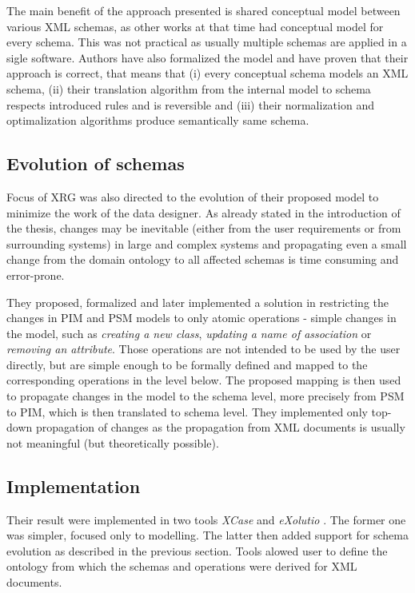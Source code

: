 The main benefit of the approach presented is shared conceptual model between various XML schemas, as other works at that time had conceptual model for every schema. This was not practical as usually multiple schemas are applied in a sigle software. Authors have also formalized the model and have proven that their approach is correct, that means that (i) every conceptual schema models an XML schema, (ii) their translation algorithm from the internal model to schema respects introduced rules and is reversible and (iii) their normalization and optimalization algorithms produce semantically same schema.

\subsection{Evolution of schemas}

Focus of XRG was also directed to the evolution \cite{nevcasky2012evolution} of their proposed model to minimize the work of the data designer. As already stated in the introduction of the thesis, changes may be inevitable (either from the user requirements or from surrounding systems) in large and complex systems and propagating even a small change from the domain ontology to all affected schemas is time consuming and error-prone.

They proposed, formalized and later implemented a solution in restricting the changes in PIM and PSM models to only atomic operations - simple changes in the model, such as \textit{creating a new class}, \textit{updating a name of association} or \textit{removing an attribute}. Those operations are not intended to be used by the user directly, but are simple enough to be formally defined and mapped to the corresponding operations in the level below. The proposed mapping is then used to propagate changes in the model to the schema level, more precisely from PSM to PIM, which is then translated to schema level. They implemented only top-down propagation of changes as the propagation from XML documents is usually not meaningful (but theoretically possible).

\subsection{Implementation}

Their result were implemented in two tools \textit{XCase} \cite{xcase} and \textit{eXolutio} \cite{exolutio}. The former one was simpler, focused only to modelling. The latter then added support for schema evolution as described in the previous section. Tools alowed user to define the ontology from which the schemas and operations were derived for XML documents.

